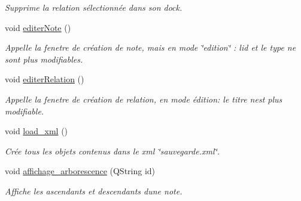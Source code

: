 \begin{DoxyCompactItemize}
\begin{DoxyCompactList}\small\item\em Supprime la relation sélectionnée dans son dock. \end{DoxyCompactList}\item 
\mbox{\label{class_fen_principale_ab8b916f06d0c149b1411781e7129fab5}} 
void \hyperlink{class_fen_principale_ab8b916f06d0c149b1411781e7129fab5}{editer\+Note} ()
\begin{DoxyCompactList}\small\item\em Appelle la fenetre de création de note, mais en mode \char`\"{}edition\char`\"{} \+: l\textquotesingle{}id et le type ne sont plus modifiables. \end{DoxyCompactList}\item 
\mbox{\label{class_fen_principale_a03e9dfdb793047a0ff1a360324d3a251}} 
void \hyperlink{class_fen_principale_a03e9dfdb793047a0ff1a360324d3a251}{editer\+Relation} ()
\begin{DoxyCompactList}\small\item\em Appelle la fenetre de création de relation, en mode édition\+: le titre n\textquotesingle{}est plus modifiable. \end{DoxyCompactList}\item 
\mbox{\label{class_fen_principale_a60879a209bf90971f1919a685c9538dd}} 
void \hyperlink{class_fen_principale_a60879a209bf90971f1919a685c9538dd}{load\+\_\+xml} ()
\begin{DoxyCompactList}\small\item\em Crée tous les objets contenus dans le xml \char`\"{}sauvegarde.\+xml\char`\"{}. \end{DoxyCompactList}\item 
void \hyperlink{class_fen_principale_adf2a7193704aaf0b73b5b10b3133488c}{affichage\+\_\+arborescence} (Q\+String id)
\begin{DoxyCompactList}\small\item\em Affiche les ascendants et descendants d\textquotesingle{}une note. \end{DoxyCompactList}\end{DoxyCompactItemize}
